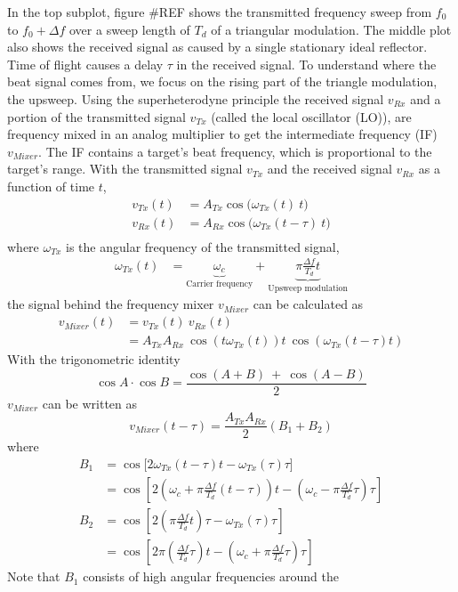 In the top subplot, figure \#REF shows the transmitted frequency sweep
from \(f_0\) to \(f_0 + \Delta f\) over a sweep length of \(T_d\) of a
triangular modulation. The middle plot also shows the received signal as
caused by a single stationary ideal reflector. Time of flight causes a
delay \(\tau\) in the received signal. To understand where the beat
signal comes from, we focus on the rising part of the triangle
modulation, the upsweep. Using the superheterodyne principle the
received signal \(v_{Rx}\) and a portion of the transmitted signal
\(v_{Tx}\) (called the local oscillator (LO)), are frequency mixed in an
analog multiplier to get the intermediate frequency (IF) \(v_{Mixer}\).
The IF contains a target's beat frequency, which is proportional to the
target's range. With the transmitted signal \(v_{Tx}\) and the received
signal \(v_{Rx}\) as a function of time \(t\), \[
\begin{aligned}
v_{Tx}(t) &= A_{Tx} \cos\bigl(\omega_{Tx}(t)~t\bigr)\\
v_{Rx}(t) &= A_{Rx} \cos\bigl(\omega_{Tx}(t-\tau)~t\bigr)\\
\end{aligned}
\] where \(\omega_{Tx}\) is the angular frequency of the transmitted
signal, \[
\begin{aligned}
\omega_{Tx}(t) &= \underbrace{\omega_c}_\text{Carrier frequency} + \underbrace{\pi \frac{\Delta f}{T_d} t}_\text{Upsweep modulation}
\end{aligned}
\] the signal behind the frequency mixer \(v_{Mixer}\) can be calculated
as \[
\begin{aligned}
v_{Mixer}(t) &= v_{Tx}(t) ~ v_{Rx}(t) \\
&= A_{Tx}A_{Rx}~\cos(t\omega_{Tx}(t))t~\cos(\omega_{Tx}(t-\tau)t)
\end{aligned}
\] With the trigonometric identity
\[ \cos A \cdot \cos B = \frac{ \cos(A+B)~+~\cos(A-B) }{2} \]
\(v_{Mixer}\) can be written as \[
v_{Mixer}(t-\tau) = \frac{A_{Tx} A_{Rx}}{2}(B_1 + B_2)
\] where \[
\begin{aligned}
B_1 &= \cos\bigl[ 2\omega_{Tx}(t-\tau) t - \omega_{Tx}(\tau)\tau \bigr]\\
    &= \cos\left[ 2\left(\omega_c + \pi\frac{\Delta f}{T_d}(t-\tau)\right)t - \left(\omega_c - \pi\frac{\Delta f}{T_d}\tau\right)\tau \right]\\
B_2 &= \cos\left[ 2\left(\pi\frac{\Delta f}{T_d}t\right)\tau - \omega_{Tx}(\tau)\tau \right]\\
    &= \cos\left[ 2\pi\left(\frac{\Delta f}{T_d}\tau\right)t - \left(\omega_c + \pi\frac{\Delta f}{T_d}\tau\right)\tau \right]
\end{aligned}
\] Note that \(B_1\) consists of high angular frequencies around the
